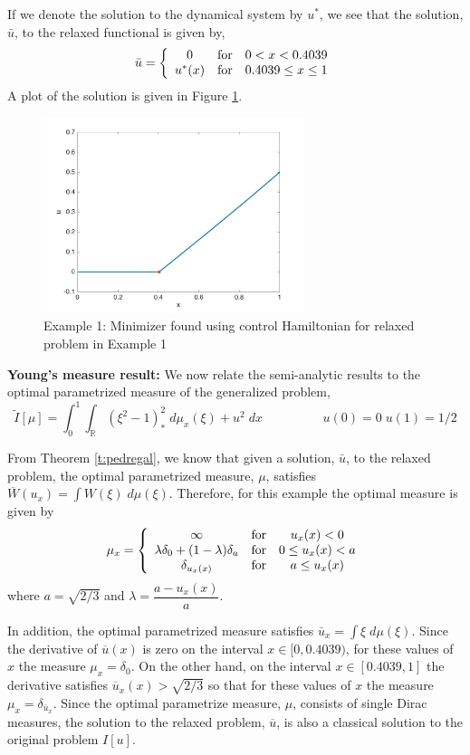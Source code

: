 \documentclass[11pt]{article}
\newcommand{\R}{\mathbb{R}}
\theoremstyle{plain}
\begin{document}
If we denote  the solution to the dynamical system by $u^*$, we see that the solution, $\bar{u}$, to the relaxed functional is given by,
\[ \bar{u} = \left \{ \begin{array}{c c c}
0 & \mbox{for} & 0< x< 0.4039\\
u^*(x) & \mbox{for} & 0.4039\leq x \leq 1
\end{array} \right.
\]
A plot of the solution is given in Figure \ref{fig:sol1}.

\begin{figure}[h] %
   \centering
   \includegraphics[width=3in]{sol1.jpg} 
   \caption{Example 1: Minimizer found using control Hamiltonian for relaxed problem in Example 1}
   \label{fig:sol1}
\end{figure}



{\bf Young's measure result:} We now relate the semi-analytic results to the optimal parametrized measure of the generalized problem,
\[ \tilde{I}[\mu] = \int_0^1 \int_\R (\xi^2-1)^2_* \;d\mu_x(\xi)+ u^2 \; dx \hspace{2cm} u(0) = 0 \;u(1) = 1/2\]

From Theorem \ref{t:pedregal}, we know that given a solution, $\bar{u}$, to the relaxed problem,  the optimal parametrized measure, $\mu$, satisfies $\overline{W}(u_x) = \int W(\xi) \;d\mu(\xi)$. Therefore, for this example the optimal measure is given by 
 \[ \mu_x = \left \{ \begin{array}{c c c}
\infty &\mbox{for} & u_x(x)< 0\\
\lambda \delta_0 + (1- \lambda) \delta_{a} & \mbox{for} & 0\leq u_x(x) < a\\
\delta_{u_x(x)} & \mbox{for} & a\leq u_x(x) 
\end{array} \right.
\]
where $a= \sqrt{2/3}$ and $\lambda = \dfrac{a-u_x(x)}{a}$.

In addition, the optimal parametrized measure satisfies $\bar{u}_x = \int \xi \;d\mu(\xi)$. Since the derivative of $\overline{u}(x)$ is zero on the interval $x \in [0,0.4039)$, for these values of $x$ the measure $\mu_x = \delta_0$. On the other hand, on the interval $x \in [0.4039,1]$ the derivative satisfies $\overline{u}_x(x)> \sqrt{2/3}$ so that for these values of $x$ the measure $\mu_x = \delta_{\bar{u}_x}$. Since the optimal parametrize measure, $\mu$, consists of single Dirac measures, the solution to the relaxed problem, $\overline{u}$, is also a classical solution to the original problem $I[u]$.
\end{document}
